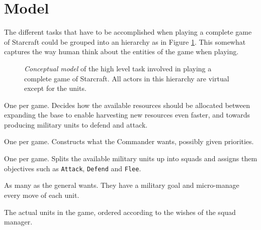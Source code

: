 \section{Model}
The different tasks that have to be accomplished when playing a complete game of Starcraft could be grouped into an hierarchy as in Figure \ref{conceptualModel}. This somewhat captures the way human think about the entities of the game when playing.

\begin{figure}[h!t]
\centering
{}
\caption{
\emph{Conceptual model} of the high level task involved in playing a complete game of Starcraft. All actors in this hierarchy are virtual except for the units.
}
\label{conceptualModel}
\end{figure}

\begin{definition}[Commander]
One per game. Decides how the available resources should be allocated between expanding the base to enable harvesting new resources even faster, and towards producing military units to defend and attack.
\end{definition}
\begin{definition}
One per game. Constructs what the Commander wants, possibly given priorities.
\end{definition}
\textbf{}\begin{definition}[General]
One per game. Splits the available military units up into squads and assigns them objectives such as \texttt{Attack}, \texttt{Defend} and \texttt{Flee}.
\end{definition}
\begin{definition}[Squad]
As many as the general wants. They have a military goal and micro-manage every move of each unit.
\end{definition}
\begin{definition}[Unit]
The actual units in the game, ordered according to the wishes of the squad manager.
\end{definition}
